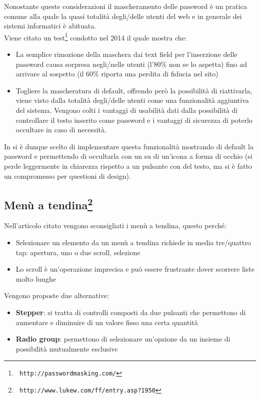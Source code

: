 Nonostante queste considerazioni il mascheramento delle password è un pratica comune
alla quale la quasi totalità degli/delle utenti del web e in generale dei sistemi informatici
è abituata.\\

Viene citato un test\footnote{\texttt{ http://passwordmasking.com/}} condotto nel 2014 il
quale mostra che:

\begin{itemize}
\item La semplice rimozione della maschera dai text field per l'inserzione delle password
causa sorpresa negli/nelle utenti (l'80\% non se lo aspetta) fino ad arrivare al sospetto
(il 60\% riporta una perdita di fiducia nel sito)
\item Togliere la mascheratura di default, offrendo però la possibilità di riattivarla,
viene visto dalla totalità degli/delle utenti come una funzionalità aggiuntiva del sistema.
Vengono colti i vantaggi di usabilità dati dalla possibilità di controllare il testo
inserito come password e i vantaggi di sicurezza di poterlo occultare in caso di necessità.
\end{itemize}

In \fiscoloMobile{} si è dunque scelto di implementare questa funzionalità mostrando di
default la password e permettendo di occultarla con un  su di un'icona a forma di
occhio
(si perde leggermente in chiarezza rispetto a un pulsante con del testo, ma si è fatto un
compromesso per questioni di design).

\subsection[Menù a tendina]{Menù a tendina\footnote{\texttt{ http://www.lukew.com/ff/entry.asp?1950}}}

Nell'articolo citato vengono sconsigliati i menù a tendina, questo perché:

\begin{itemize}
\item Selezionare un elemento da un menù a tendina richiede in media tre/quattro
tap: apertura, uno o due scroll, selezione
\item Lo scroll è un'operazione imprecisa e può essere frustrante dover scorrere
liste molto lunghe
\end{itemize}

Vengono proposte due alternative:

\begin{itemize}
\item \textbf{Stepper}: si tratta di controlli composti da due pulsanti che permettono
di aumentare e diminuire di un valore fisso una certa quantità
\item \textbf{Radio group}: permettono di selezionare un'opzione da un insieme di
possibilità mutualmente esclusive
\end{itemize}

